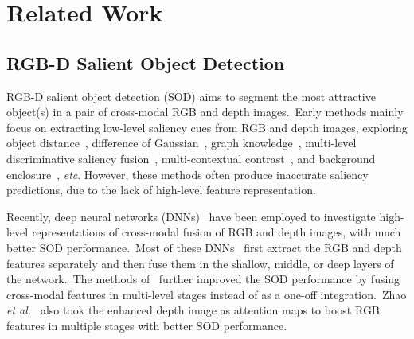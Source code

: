\documentclass[journal]{IEEEtran}
\def\etc{\emph{etc}}
\def\etal{{\em et al.~}}
\begin{document}
\section{Related Work}
\label{sec:related}


\subsection{RGB-D Salient Object Detection}
RGB-D salient object detection (SOD) aims to segment the most attractive object(s) in a pair of cross-modal RGB and depth images.\
Early methods mainly focus on extracting low-level saliency cues from RGB and depth images, exploring object distance~\cite{liang2012depth}, difference of Gaussian~\cite{ju2014depth}, graph knowledge~\cite{cong2016saliency}, multi-level discriminative saliency fusion~\cite{song2017depth}, multi-contextual contrast~\cite{cong2019going,peng2014rgbd}, and background enclosure~\cite{feng2016local}, \etc.
However, these methods often produce inaccurate saliency predictions, due to the lack of high-level feature representation.

Recently, deep neural networks (DNNs)~\cite{he2016deep} have been employed to investigate high-level representations of cross-modal fusion of RGB and depth images, with much better SOD performance.\ 
Most of these DNNs~\cite{chen2019multi,han2017cnns,wang2019adaptive} first extract the RGB and depth features separately and then fuse them in the shallow, middle, or deep layers of the network.\  
The methods of~\cite{chen2018progressively,chen2019three,li2020icnet,piao2019depth} further improved the SOD performance by fusing cross-modal features in multi-level stages instead of as a one-off integration.\
Zhao \etal\cite{zhao2019Contrast} also took the enhanced depth image as attention maps to boost RGB features in multiple stages with better SOD performance.
\end{document}
